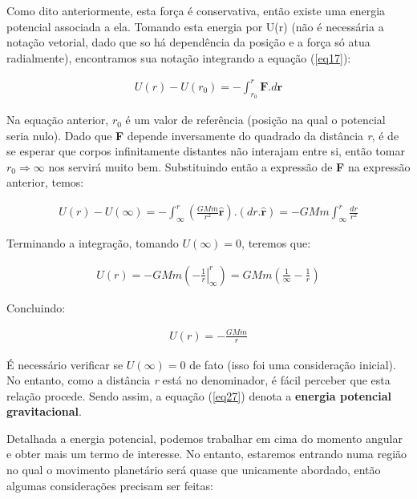 Como dito anteriormente, esta força é conservativa, então existe uma energia potencial associada a ela. Tomando esta energia por U(r) (não é necessária a notação vetorial, dado que so há dependência da posição e a força só atua radialmente), encontramos sua notação integrando a equação (\ref{eq17}):

\begin{eqnarray}
    U(r) - U(r_0) = -\int_{r_0}^{r}{\mathbf{F}.d\mathbf{r}}    \label{eq24}
\end{eqnarray}

Na equação anterior, $r_0$ é um valor de referência (posição na qual o potencial seria nulo). Dado que \textbf{F} depende inversamente do quadrado da distância \textit{r}, é de se esperar que corpos infinitamente distantes não interajam entre si, então tomar $r_0 \Rightarrow \infty$ nos servirá muito bem. Substituindo então a expressão de \textbf{F} na expressão anterior, temos:

\begin{eqnarray}
    U(r) - U(\infty) = -\int_{\infty}^{r}{\left(\frac{GMm}{r^2}\mathbf{\hat{r}}\right).\left(dr.\mathbf{\hat{r}}\right)} =  -GMm\int_{\infty}^{r}{\frac{dr}{r^2}}    \label{eq25}
\end{eqnarray}

Terminando a integração, tomando $U(\infty) = 0$, teremos que:

\begin{eqnarray}
    U(r) = -GMm\left(-\left.\frac{1}{r}\right|_{\infty}^r \right) = GMm \left( \frac{1}{\infty} - \frac{1}{r} \right)    \label{eq26}
\end{eqnarray}

Concluindo:

\begin{eqnarray}
    U(r) = -\frac{GMm}{r} \label{eq27}
\end{eqnarray}

É necessário verificar se $U(\infty) = 0$ de fato (isso foi uma consideração inicial). No entanto, como a distância \textit{r} está no denominador, é fácil perceber que esta relação procede. Sendo assim, a equação (\ref{eq27}) denota a \textbf{energia potencial gravitacional}.{\\}

Detalhada a energia potencial, podemos trabalhar em cima do momento angular e obter mais um termo de interesse. No entanto, estaremos entrando numa região no qual o movimento planetário será quase que unicamente abordado, então algumas considerações precisam ser feitas:

